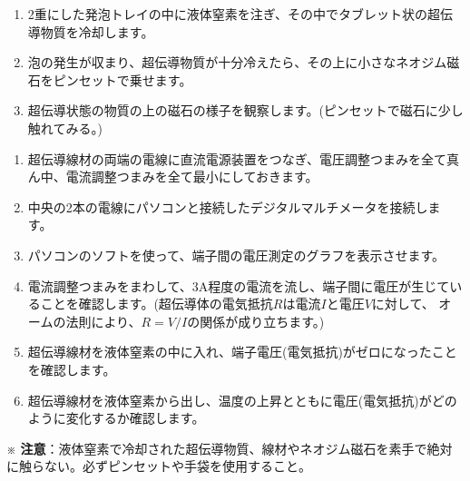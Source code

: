 \bigskip



\begin{enumerate}

\item 2重にした発泡トレイの中に液体窒素を注ぎ、その中でタブレット状の超伝導物質を冷却します。
\item 泡の発生が収まり、超伝導物質が十分冷えたら、その上に小さなネオジム磁石をピンセットで乗せます。
\item 超伝導状態の物質の上の磁石の様子を観察します。(ピンセットで磁石に少し触れてみる。)

\end{enumerate}


\bigskip


\begin{enumerate}

\item  超伝導線材の両端の電線に直流電源装置をつなぎ、電圧調整つまみを全て真ん中、電流調整つまみを全て最小にしておきます。
\item 中央の2本の電線にパソコンと接続したデジタルマルチメータを接続します。
\item パソコンのソフトを使って、端子間の電圧測定のグラフを表示させます。
\item 電流調整つまみをまわして、3A程度の電流を流し、端子間に電圧が生じていることを確認します。(超伝導体の電気抵抗$R$は電流$I$と電圧$V$に対して、
オームの法則により、$R=V/I$の関係が成り立ちます。)
\item 超伝導線材を液体窒素の中に入れ、端子電圧(電気抵抗)がゼロになったことを確認します。
\item 超伝導線材を液体窒素から出し、温度の上昇とともに電圧(電気抵抗)がどのように変化するか確認します。

\end{enumerate}

\bigskip
\hspace*{-\parindent}
※ {\bf 注意}：液体窒素で冷却された超伝導物質、線材やネオジム磁石を素手で絶対に触らない。必ずピンセットや手袋を使用すること。


